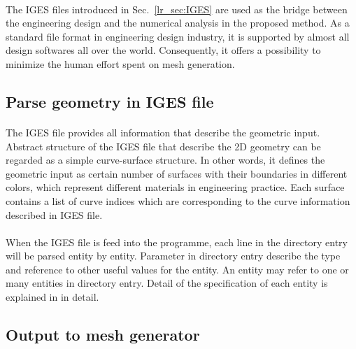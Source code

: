 \paragraph{}
The IGES\citep{IGES1983} files introduced in Sec.~\ref{lr_sec:IGES} are used as the bridge between the engineering design and the numerical analysis in the proposed method.
As a standard file format in engineering design industry, it is supported by almost all design softwares all over the world.
Consequently, it offers a possibility to minimize the human effort spent on mesh generation.

\subsection{Parse geometry in IGES file}
\paragraph{}
The IGES file provides all information that describe the geometric input.
Abstract structure of the IGES file that describe the 2D geometry can be regarded as a simple curve-surface structure.
In other words, it defines the geometric input as certain number of surfaces with their boundaries in different colors, which represent different materials in engineering practice.
Each surface contains a list of curve indices which are corresponding to the curve information described in IGES file.

\paragraph{}
When the IGES file is feed into the programme, each line in the directory entry will be parsed entity by entity.
Parameter in directory entry describe the type and reference to other useful values for the entity.
An entity may refer to one or many entities in directory entry.
Detail of the specification of each entity is explained in \citep{Nasr2007} in detail.

\subsection{Output to mesh generator}
\label{qdt_section:iges_output}
